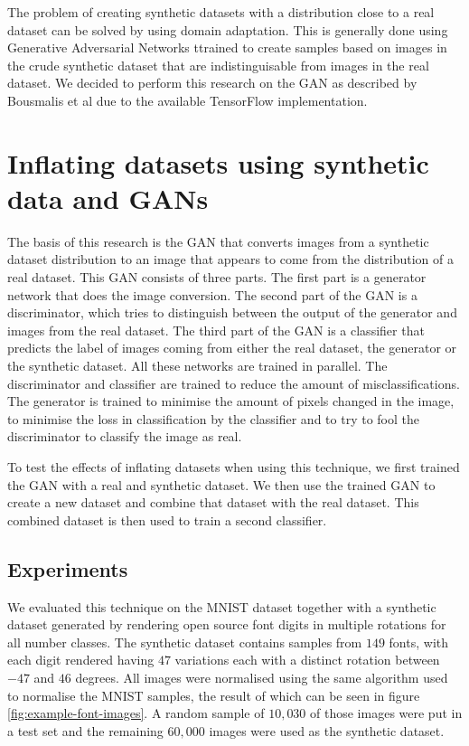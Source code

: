 \documentclass[10pt,twocolumn,letterpaper]{article}
\begin{document}
The problem of creating synthetic datasets with a distribution close to a real dataset can be solved by using domain adaptation. This is generally done using Generative Adversarial Networks \cite{1703.05192.pdf, 10.1109/CVPR.2017.18, 10.1007/978-3-319-58347-1} ttrained to create samples based on images in the crude synthetic dataset that are indistinguisable from images in the real dataset. We decided to perform this research on the GAN as described by Bousmalis et al \cite{10.1109/CVPR.2017.18} due to the available TensorFlow \cite{tensorflow} implementation.

\section{Inflating datasets using synthetic data and GANs}

The basis of this research is the GAN that converts images from a synthetic dataset distribution to an image that appears to come from the distribution of a real dataset. This GAN consists of three parts. The first part is a generator network that does the image conversion. The second part of the GAN is a discriminator, which tries to distinguish between the output of the generator and images from the real dataset. The third part of the GAN is a classifier that predicts the label of images coming from either the real dataset, the generator or the synthetic dataset. All these networks are trained in parallel. The discriminator and classifier are trained to reduce the amount of misclassifications. The generator is trained to minimise the amount of pixels changed in the image, to minimise the loss in classification by the classifier and to try to fool the discriminator to classify the image as real.

To test the effects of inflating datasets when using this technique, we first trained the GAN with a real and synthetic dataset. We then use the trained GAN to create a new dataset and combine that dataset with the real dataset. This combined dataset is then used to train a second classifier.

\subsection{Experiments}


We evaluated this technique on the MNIST dataset \cite{mnist} together with a synthetic dataset generated by rendering open source font digits in multiple rotations for all number classes.
The synthetic dataset contains samples from $149$ fonts, with each digit rendered having $47$ variations each with a distinct rotation between $-47$ and $46$ degrees. All images were normalised using the same algorithm used to normalise the MNIST samples, the result of which can be seen in figure \ref{fig:example-font-images}. A random sample of $10,030$ of those images were put in a test set and the remaining $60,000$ images were used as the synthetic dataset.
\end{document}
